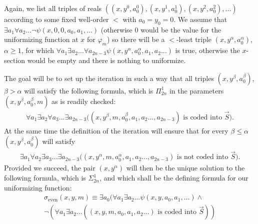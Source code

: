 \documentclass[a4paper,11pt]{article}
\begin{document}
Again, we list all triples of reals $ ((x,y^0,a_0^0) , (x, y^1, a_0^1), (x,y^2,a_0^2) ,...)$ according to some fixed well-order $<$ with $a_0=y_0=0$. We assume that $\exists a_1 \forall a_2... \lnot \psi(x,0,0,a_0,a_1,...)$ (otherwise $0$ would be the value for the uniformizing function at $x$ for $\varphi_m$) so  there will be a $<$-least triple $(x,y^{\alpha}, a_0^{\alpha} )$, $\alpha \ge 1$, for which $\forall a_1 \exists a_2... \forall a_{2n-3} \psi (x,y^{\alpha},a^{\alpha}_0, a_1,a_2...)$ is true, otherwise the $x$-section would be empty and there is nothing to uniformize.

The goal will be to set up the iteration in such a way that all triples $(x,y^{\beta} ,a_0^{\beta})$, $\beta > \alpha$ will satisfy the following formula, which is $\Pi^1_{2n}$ in the parameters $( x , y^{\beta}, a^{\beta}_0,m)$ as is readily checked:
\begin{align*}
\forall a_{1} \exists a_{2} \forall a_{3}... \exists a_{2n-3} (( x,y^{\beta} ,m, a_0^{\beta},a_1,a_2...,a_{2n-3} )\text{ is coded into $\vec{S} )$.}
\end{align*}
At the same time the definition of the iteration will ensure that for every $\beta  \le \alpha$  $(x,y^{\beta}, a^{\beta}_0)$ will satisfy 
\begin{align*}
\exists a_{1} \forall a_{2} \exists a_{3}... \exists a_{2n-3} (( x,y^{\alpha} ,m, a_0^{\alpha},a_1,a_2...,a_{2n-3} )\text{ is not  coded into $\vec{S} )$.}
\end{align*}
Provided we succeed, the pair $(x,y^{\alpha})$ will then be the unique solution to the following formula, which is $\Sigma^1_{2n}$, and which shall be the defining formula for our uniformizing function:
\begin{align*}
\sigma_{\text{even}} (x,y,m) \equiv \exists a_0 ( \forall a_1 \exists a_2...\psi (x,y,a_0,a_1,...) \land \\
\lnot ( \forall a_1 \exists a_2... ( ( x,y ,m, a_0 ,a_1 ,a_2...) \text{ is coded into $\vec{S}$}) )
\end{align*}
\end{document}
